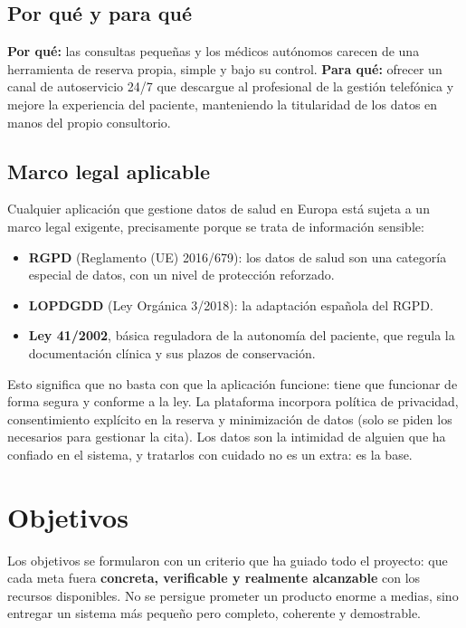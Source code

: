 \documentclass[12pt,a4paper]{report}
\begin{document}
\section{Por qué y para qué}

\textbf{Por qué:} las consultas pequeñas y los médicos autónomos carecen de una herramienta de reserva propia, simple y bajo su control. \textbf{Para qué:} ofrecer un canal de autoservicio 24/7 que descargue al profesional de la gestión telefónica y mejore la experiencia del paciente, manteniendo la titularidad de los datos en manos del propio consultorio.

\section{Marco legal aplicable}

Cualquier aplicación que gestione datos de salud en Europa está sujeta a un marco legal exigente, precisamente porque se trata de información sensible:

\begin{itemize}
  \item \textbf{RGPD} (Reglamento (UE) 2016/679): los datos de salud son una categoría especial de datos, con un nivel de protección reforzado.
  \item \textbf{LOPDGDD} (Ley Orgánica 3/2018): la adaptación española del RGPD.
  \item \textbf{Ley 41/2002}, básica reguladora de la autonomía del paciente, que regula la documentación clínica y sus plazos de conservación.
\end{itemize}

Esto significa que no basta con que la aplicación funcione: tiene que funcionar de forma segura y conforme a la ley. La plataforma incorpora política de privacidad, consentimiento explícito en la reserva y minimización de datos (solo se piden los necesarios para gestionar la cita). Los datos son la intimidad de alguien que ha confiado en el sistema, y tratarlos con cuidado no es un extra: es la base.

\chapter{Objetivos}

Los objetivos se formularon con un criterio que ha guiado todo el proyecto: que cada meta fuera \textbf{concreta, verificable y realmente alcanzable} con los recursos disponibles. No se persigue prometer un producto enorme a medias, sino entregar un sistema más pequeño pero completo, coherente y demostrable.
\end{document}
